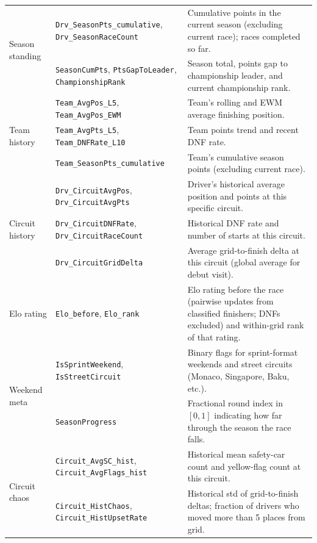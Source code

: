 \documentclass[12pt, a4paper, oneside]{report}
\begin{document}
\begin{table}[H]
\begin{tabularx}{\textwidth}{@{} l l X @{}}
  \midrule
  \multirow{2}{*}{Season standing}
    & \texttt{Drv\_SeasonPts\_cumulative}, \texttt{Drv\_SeasonRaceCount}
      & Cumulative points in the current season (excluding current race); races completed so far. \\
    & \texttt{SeasonCumPts}, \texttt{PtsGapToLeader}, \texttt{ChampionshipRank}
      & Season total, points gap to championship leader, and current championship rank. \\
  \midrule
  \multirow{3}{*}{Team history}
    & \texttt{Team\_AvgPos\_L5}, \texttt{Team\_AvgPos\_EWM}
      & Team's rolling and EWM average finishing position. \\
    & \texttt{Team\_AvgPts\_L5}, \texttt{Team\_DNFRate\_L10}
      & Team points trend and recent DNF rate. \\
    & \texttt{Team\_SeasonPts\_cumulative}
      & Team's cumulative season points (excluding current race). \\
  \midrule
  \multirow{3}{*}{Circuit history}
    & \texttt{Drv\_CircuitAvgPos}, \texttt{Drv\_CircuitAvgPts}
      & Driver's historical average position and points at this specific circuit. \\
    & \texttt{Drv\_CircuitDNFRate}, \texttt{Drv\_CircuitRaceCount}
      & Historical DNF rate and number of starts at this circuit. \\
    & \texttt{Drv\_CircuitGridDelta}
      & Average grid-to-finish delta at this circuit (global average for debut visit). \\
  \midrule
  Elo rating
    & \texttt{Elo\_before}, \texttt{Elo\_rank}
      & Elo rating before the race (pairwise updates from classified finishers; DNFs excluded) and within-grid rank of that rating. \\
  \midrule
  \multirow{2}{*}{Weekend meta}
    & \texttt{IsSprintWeekend}, \texttt{IsStreetCircuit}
      & Binary flags for sprint-format weekends and street circuits (Monaco, Singapore, Baku, etc.). \\
    & \texttt{SeasonProgress}
      & Fractional round index in $[0,1]$ indicating how far through the season the race falls. \\
  \midrule
  \multirow{2}{*}{Circuit chaos}
    & \texttt{Circuit\_AvgSC\_hist}, \texttt{Circuit\_AvgFlags\_hist}
      & Historical mean safety-car count and yellow-flag count at this circuit. \\
    & \texttt{Circuit\_HistChaos}, \texttt{Circuit\_HistUpsetRate}
      & Historical std of grid-to-finish deltas; fraction of drivers who moved more than 5 places from grid. \\

\end{tabularx}
\end{table}
\end{document}
